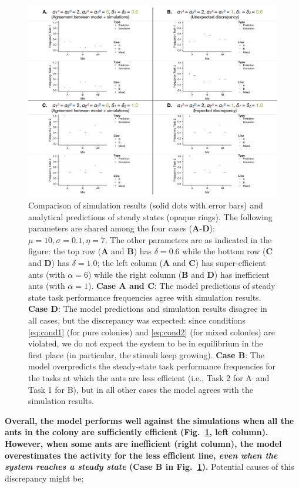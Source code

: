 \documentclass[10pt]{article}
\theoremstyle{remark}
\newcommand{\A}{{\color{red}A}}
\newcommand{\B}{{\color{blue}B}}
\begin{document}
\begin{figure}[H]
    \centering
    \includegraphics[trim={0 0.25in 0 0.2in}, clip, width=0.9\linewidth]{5050_comparison.pdf}
    \caption{Comparison of simulation results (solid dots with error bars) and analytical predictions of steady states (opaque rings). The following parameters are shared among the four cases (\textbf{A}-\textbf{D}): $\mu = 10, \sigma = 0.1, \eta = 7$. The other parameters are as indicated in the figure: the top row (\textbf{A} and \textbf{B}) has $\delta = 0.6$ while the bottom row (\textbf{C} and \textbf{D}) has $\delta = 1.0$; the left column (\textbf{A} and \textbf{C}) has super-efficient ants (with $\alpha = 6$) while the right column (\textbf{B} and \textbf{D}) has inefficient ants (with $\alpha = 1$). \textbf{Case A and C}: The model predictions of steady state task performance frequencies agree with simulation results. \textbf{Case D}: The model predictions and simulation results disagree in all cases, but the discrepancy was expected: since conditions \eqref{eq:cond1} (for pure colonies) and \eqref{eq:cond2} (for mixed colonies) are violated, we do not expect the system to be in equilibrium in the first place (in particular, the stimuli keep growing). \textbf{Case B}: The model overpredicts the steady-state task performance frequencies for the tasks at which the ants are less efficient (i.e., Task 2 for \A\ and Task 1 for \B), but in all other cases the model agrees with the simulation results.}
    \label{fig:5050_comp}
\end{figure}
\vspace{-5pt}
\textbf{Overall, the model performs well against the simulations when all the ants in the colony are sufficiently efficient (Fig.~\ref{fig:5050_comp}, left column). However, when some ants are inefficient (right column), the model overestimates the activity for the less efficient line, \textit{even when the system reaches a steady state} (\textbf{Case B} in Fig.~\ref{fig:5050_comp}).} Potential causes of this discrepancy might be:
\end{document}

